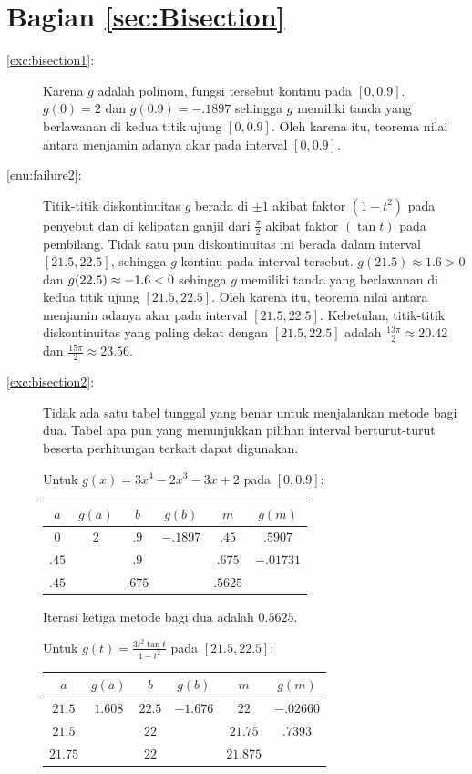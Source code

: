 \section*{Bagian \ref{sec:Bisection}}
\begin{description}
\item [{\ref{exc:bisection1}:}] Karena $g$ adalah polinom, fungsi tersebut
kontinu pada $[0,0.9]$. $g(0)=2$ dan $g(0.9)=-.1897$ sehingga $g$
memiliki tanda yang berlawanan di kedua titik ujung $[0,0.9]$. Oleh
karena itu, teorema nilai antara menjamin adanya akar pada interval
$[0,0.9]$.
\item [{\ref{enu:failure2}:}] Titik-titik diskontinuitas $g$ berada di
$\pm1$ akibat faktor $(1-t^{2})$ pada penyebut dan di kelipatan
ganjil dari $\frac{\pi}{2}$ akibat faktor $(\tan t)$ pada pembilang.
Tidak satu pun diskontinuitas ini berada dalam interval $[21.5,22.5]$,
sehingga $g$ kontinu pada interval tersebut. $g(21.5)\approx1.6>0$
dan $g(22.5)\approx\text{\textminus}1.6<0$ sehingga $g$ memiliki
tanda yang berlawanan di kedua titik ujung $[21.5,22.5]$. Oleh karena
itu, teorema nilai antara menjamin adanya akar pada interval $[21.5,22.5]$.
Kebetulan, titik-titik diskontinuitas yang paling dekat dengan $[21.5,22.5]$
adalah $\frac{13\pi}{2}\approx20.42$ dan $\frac{15\pi}{2}\approx23.56$. 
\item [{\ref{exc:bisection2}:}] Tidak ada satu tabel tunggal yang benar
untuk menjalankan metode bagi dua. Tabel apa pun yang menunjukkan
pilihan interval berturut-turut beserta perhitungan terkait dapat
digunakan. 

Untuk $g(x)=3x^{4}-2x^{3}-3x+2$ pada $[0,0.9]$:

\begin{center}
\begin{tabular}{cccc|c|c}
$a$ & $g(a)$ & $b$ & $g(b)$ & $m$ & $g(m)$\tabularnewline
\hline 
$0$ & $2$ & $.9$ & $-.1897$ & $.45$ & $.5907$\tabularnewline
$.45$ &  & $.9$ &  & $.675$ & $-.01731$\tabularnewline
$.45$ &  & $.675$ &  & $.5625$ & \tabularnewline
\end{tabular}
\par\end{center}

Iterasi ketiga metode bagi dua adalah $0.5625$.

Untuk $g(t)=\frac{3t^{2}\tan t}{1-t^{2}}$ pada $[21.5,22.5]$:

\begin{center}
\begin{tabular}{cccc|c|c}
$a$ & $g(a)$ & $b$ & $g(b)$ & $m$ & $g(m)$\tabularnewline
\hline 
$21.5$ & $1.608$ & $22.5$ & $-1.676$ & $22$ & $-.02660$\tabularnewline
$21.5$ &  & $22$ &  & $21.75$ & $.7393$\tabularnewline
$21.75$ &  & $22$ &  & $21.875$ & \tabularnewline
\end{tabular}
\par\end{center}


\end{description}
